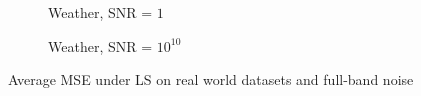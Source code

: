 \begin{figure}
\begin{subfigure}{0.3\columnwidth}
    \label{weather_MSE_subfiga}
    \end{subfigure}\hfill
    \begin{subfigure}{0.3\columnwidth}
    \caption{Weather, SNR = $1$}%
    \label{weather_MSE_subfigb}%
    \end{subfigure}\hfill%
    \begin{subfigure}{0.3\columnwidth}
    \caption{Weather, SNR = $10^{10}$}%
    \label{weather_MSE_subfigc}%
    \end{subfigure}%
    \caption{Average MSE under LS on real world datasets and full-band noise }
\label{LS_real_MSE_fig}
\end{figure}

